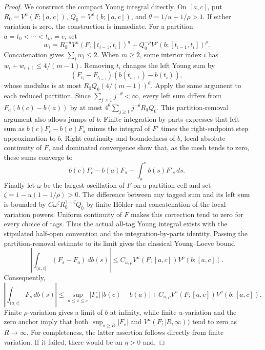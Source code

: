 \documentclass[11pt]{article}
\numberwithin{equation}{section}
\theoremstyle{remark}
\theoremstyle{definition}
\begin{document}
\begin{proof}
We construct the compact Young integral directly. On $[a,c]$, put
$R_0=V^u(F;[a,c])$, $Q_0=V^\rho(b;[a,c])$, and
$\theta=1/u+1/\rho>1$. If either variation is zero, the construction
is immediate. For a partition $a=t_0<\cdots<t_m=c$, set
\[
 w_i=R_0^{-u}V^u(F;[t_{i-1},t_i])^u
     +Q_0^{-\rho}V^\rho(b;[t_{i-1},t_i])^\rho.
\]
Concatenation gives $\sum_iw_i\le2$. When $m\ge2$, some interior
index $i$ has $w_i+w_{i+1}\le4/(m-1)$. Removing $t_i$ changes
the left Young sum by
\[
 (F_{t_i}-F_{t_{i-1}})(b(t_{i+1})-b(t_i)),
\]
whose modulus is at most $R_0Q_0(4/(m-1))^\theta$.
Apply the same argument to each reduced partition. Since
$\sum_{j\ge1}j^{-\theta}<\infty$, every left sum differs from
$F_a(b(c)-b(a))$ by at most
$4^\theta\sum_{j\ge1}j^{-\theta}R_0Q_0$.
This partition-removal argument also allows jumps of $b$.
Finite integration by parts expresses that left sum as
$b(c)F_c-b(a)F_a$ minus the integral of $F'$ times the right-endpoint
step approximation to $b$.  Right continuity and boundedness of $b$,
local absolute continuity of $F$, and dominated convergence show that,
as the mesh tends to zero, these sums converge to
\[
 b(c)F_c-b(a)F_a-\int_a^c b(s)F'_s\,ds.
\]
Finally let $\omega$ be the largest oscillation of $F$ on a partition
cell and set $\zeta=1-u(1-1/\rho)>0$.  The difference between any
tagged sum and its left sum is bounded by
$C\omega^\zeta R_0^{1-\zeta}Q_0$ by finite H\"older and concatenation of the local variation powers.
Uniform continuity of $F$ makes this correction tend to zero for every
choice of tags.  Thus the actual all-tag Young integral exists with
the stipulated half-open convention and the integration-by-parts
identity.  Passing the partition-removal estimate to its limit gives the
classical Young--Loeve bound \cite{Young1936}
\begin{equation}\label{eq:young-loeve}
 \left|\int_{(a,c]}(F_s-F_a)\,db(s)\right|
 \le C_{u,\rho}V^u(F;[a,c])V^\rho(b;[a,c]).
\end{equation}
Consequently,
\begin{equation}\label{eq:young-local-tail-bound}
 \left|\int_{(a,c]}F_s\,db(s)\right|
 \le \sup_{a\le s\le c}|F_s|\,|b(c)-b(a)|
 +C_{u,\rho}V^u(F;[a,c])V^\rho(b;[a,c]).
\end{equation}
Finite $\rho$-variation gives a limit of $b$ at infinity, while finite
$u$-variation and the zero anchor imply that both
$\sup_{s\ge R}|F_s|$ and $V^u(F;[R,\infty))$ tend to zero as
$R\to\infty$.  For completeness, the latter assertion follows directly
from finite variation.  If it failed, there would be an $\eta>0$ and,

\end{proof}
\end{document}
